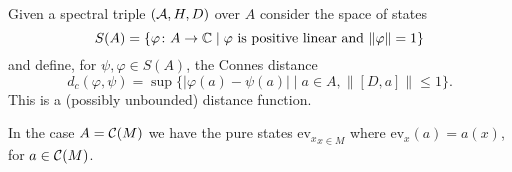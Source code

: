 \begin{definition}
 Given a spectral triple $(\mathcal{A},H,D)$ over $A$ consider the space of states $$S(A)=\{\varphi\colon A\to\mathbb{C}\mid\varphi\text{ is positive linear and }\|\varphi\|=1\}$$ and define, for $\psi,\varphi\in S(A)$, the Connes distance $$d_c(\varphi,\psi)=\sup\{|\varphi(a)-\psi(a)|\mid a\in A, \|[D,a]\|\leq 1\}.$$
 This is a (possibly unbounded) distance function.
\end{definition}

\noindent In the case $A=\mathcal{C}(M)$ we have the pure states ${\mathrm{ev}_x}_{x\in M}$ where $\mathrm{ev}_x(a)=a(x)$, for $a\in\mathcal{C}(M)$.


